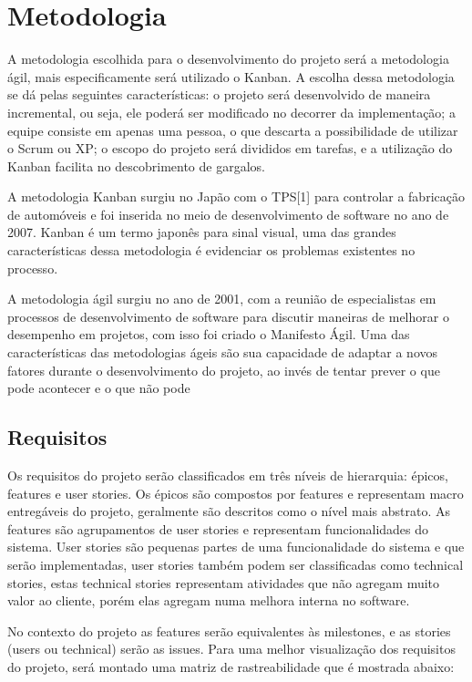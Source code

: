 \chapter*[Metodologia]{Metodologia}
A metodologia escolhida para o desenvolvimento do projeto será a metodologia ágil, mais especificamente será utilizado o Kanban. A escolha dessa metodologia se dá pelas seguintes características: o projeto será desenvolvido de maneira incremental, ou seja, ele poderá ser modificado no decorrer da implementação; a equipe consiste em apenas uma pessoa, o que descarta a possibilidade de utilizar o Scrum ou XP; o escopo do projeto será divididos em tarefas, e a utilização do Kanban facilita no descobrimento de gargalos.

A metodologia Kanban surgiu no Japão com o TPS[1] para controlar a fabricação de automóveis e foi inserida no meio de desenvolvimento de software no ano de 2007. Kanban é um termo japonês para sinal visual, uma das grandes características dessa metodologia é evidenciar os problemas existentes no processo. 

A metodologia ágil surgiu no ano de 2001, com a reunião de especialistas em processos de desenvolvimento de software para discutir maneiras de melhorar o desempenho em projetos, com isso foi criado o Manifesto Ágil. Uma das características das metodologias ágeis são sua capacidade de adaptar a novos fatores durante o desenvolvimento do projeto, ao invés de tentar prever o que pode acontecer e o que não pode
\section*{Requisitos}
Os requisitos do projeto serão classificados em três níveis de hierarquia:  épicos, features e user stories. Os épicos são compostos por features e representam macro entregáveis do projeto, geralmente são descritos como o nível mais abstrato. As features são agrupamentos de user stories e representam funcionalidades do sistema. User stories são pequenas partes de uma funcionalidade do sistema e que serão implementadas, user stories também podem ser classificadas como technical stories, estas technical stories representam atividades que não agregam muito valor ao cliente, porém elas agregam numa melhora interna no software.

No contexto do projeto as features serão equivalentes às milestones, e as stories (users ou technical) serão as issues. Para uma melhor visualização dos requisitos do projeto, será montado uma matriz de rastreabilidade que é mostrada abaixo:
